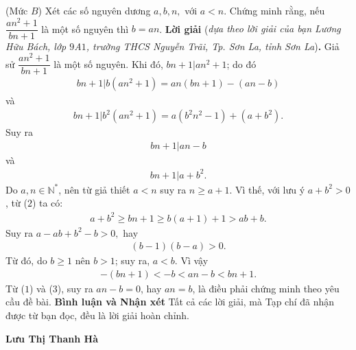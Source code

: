 \begin{multicols}{2}
	{}
	(Mức $B$) Xét các số nguyên dương $a,b,n,$  với $a<n.$ Chứng minh rằng, nếu  $\dfrac{an^2+1}{bn+1}$ là một số nguyên thì $b=an$. 
	\vskip 0.05cm
	\textbf{\color{thachthuctoanhoc}Lời giải} (\textit{dựa theo lời giải của bạn Lương Hữu Bách, lớp $9$A$1$, trường THCS Nguyễn Trãi, Tp. Sơn La, tỉnh Sơn La})\textbf{\color{thachthuctoanhoc}.}
	\vskip 0.05cm
	Giả sử $\dfrac{{a{n^2} + 1}}{{bn + 1}}$ là một số nguyên.
	\vskip 0.05cm
	Khi đó, $\left. {bn + 1} \right|a{n^2} + 1$;  do đó
	\begin{align*}
		\left. {bn \!+\! 1} \right|b\left( {a{n^2} \!+\! 1} \right) \!=\! an\left( {bn \!+\! 1} \right) \!-\! \left( {an \!-\! b} \right)
	\end{align*}
	và     
	\begin{align*}
		\left. {bn \!+\! 1} \right|{b^2}\left(\!{a{n^2} \!+\! 1} \!\right) \!=\! a\left( \!{{b^2}{n^2} \!-\! 1}\! \right) \!+\! \left(\!{a \!+\! {b^2}} \right).
	\end{align*}                                     
	Suy ra
	\begin{align*}
		\left. {bn + 1} \right|an - b \tag{$1$}
	\end{align*}
	và 
	\begin{align*}
		\left. {bn + 1} \right|a + {b^2}. \tag{$2$}
	\end{align*}
	Do $a, n \in \mathbb{N^*}$, nên từ giả thiết $a < n$ suy ra $n \ge  a + 1$. Vì thế, với lưu ý $a + b^2 > 0$,  từ ($2$) ta có:
	\begin{align*}
		a + {b^2} \ge bn + 1 \ge b\left( {a + 1} \right) + 1 > ab + b.
	\end{align*}
	Suy ra $a - ab + {b^2} - b > 0,$  hay
	\begin{align*}
		\left( {b - 1} \right)\left( {b - a} \right) > 0.
	\end{align*}
	Từ đó, do $b \ge 1$ nên $b > 1$; suy ra, $a < b$. Vì vậy
	\begin{align*}
		- \left( {bn + 1} \right) <  - b < an - b < bn + 1. \tag{$3$}
	\end{align*}
	Từ ($1$) và ($3$), suy ra $an - b = 0$, hay $an = b$, là điều phải chứng minh theo yêu cầu đề bài.
	\vskip 0.05cm
	\textbf{\color{thachthuctoanhoc}Bình luận và Nhận xét}
	\vskip 0.05cm
	Tất cả các lời giải, mà Tạp chí đã nhận được từ bạn đọc, đều là lời giải hoàn chỉnh.
	\begin{flushright}
		\textbf{\color{thachthuctoanhoc}Lưu Thị Thanh Hà}
	\end{flushright}
	{}

\end{multicols}
